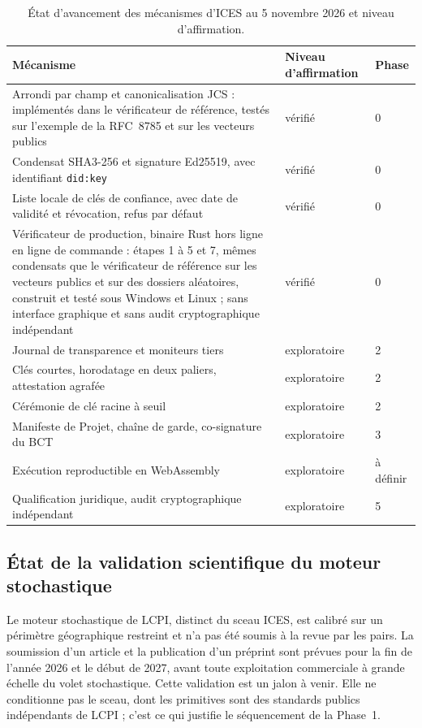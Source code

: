 \documentclass[11pt,a4paper]{article}
\begin{document}
\begin{table}[H]\centering\small
\caption{État d'avancement des mécanismes d'ICES au 5 novembre 2026 et niveau d'affirmation.}\label{tab:maturite}
\begin{tabularx}{\linewidth}{@{}Xp{2.5cm}p{1.5cm}@{}}
\toprule
\textbf{Mécanisme} & \textbf{Niveau d'affirmation} & \textbf{Phase} \\
\midrule
Arrondi par champ et canonicalisation JCS : implémentés dans le vérificateur de référence, testés sur l'exemple de la RFC~8785 et sur les vecteurs publics & vérifié & 0 \\
Condensat SHA3-256 et signature Ed25519, avec identifiant \texttt{did:key} & vérifié & 0 \\
Liste locale de clés de confiance, avec date de validité et révocation, refus par défaut & vérifié & 0 \\
Vérificateur de production, binaire Rust hors ligne en ligne de commande : étapes 1 à 5 et 7, mêmes condensats que le vérificateur de référence sur les vecteurs publics et sur des dossiers aléatoires, construit et testé sous Windows et Linux ; sans interface graphique et sans audit cryptographique indépendant & vérifié & 0 \\
Journal de transparence et moniteurs tiers & exploratoire & 2 \\
Clés courtes, horodatage en deux paliers, attestation agrafée & exploratoire & 2 \\
Cérémonie de clé racine à seuil & exploratoire & 2 \\
Manifeste de Projet, chaîne de garde, co-signature du BCT & exploratoire & 3 \\
Exécution reproductible en WebAssembly & exploratoire & à définir \\
Qualification juridique, audit cryptographique indépendant & exploratoire & 5 \\
\bottomrule
\end{tabularx}
\end{table}

\subsection{État de la validation scientifique du moteur stochastique}

Le moteur stochastique de LCPI, distinct du sceau ICES, est calibré sur un périmètre géographique restreint et n'a pas été soumis à la revue par les pairs. La soumission d'un article et la publication d'un préprint sont prévues pour la fin de l'année 2026 et le début de 2027, avant toute exploitation commerciale à grande échelle du volet stochastique. Cette validation est un jalon à venir. Elle ne conditionne pas le sceau, dont les primitives sont des standards publics indépendants de LCPI ; c'est ce qui justifie le séquencement de la Phase~1.
\end{document}
